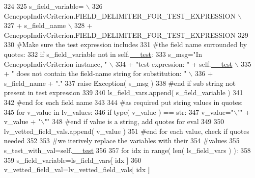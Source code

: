 \begin{DoxyCode}
324 
325             s\_field\_variable= \(\backslash\)
326                     GenepopIndivCriterion.FIELD\_DELIMITER\_FOR\_TEST\_EXPRESSION \(\backslash\)
327                     + s\_field\_name \(\backslash\)
328                     + GenepopIndivCriterion.FIELD\_DELIMITER\_FOR\_TEST\_EXPRESSION
329 
330             \textcolor{comment}{#Make sure the test expression includes}
331             \textcolor{comment}{#the field name surrounded by quotes:}
332             \textcolor{keywordflow}{if} s\_field\_variable  \textcolor{keywordflow}{not} \textcolor{keywordflow}{in} self.\hyperlink{classnegui_1_1genepopindividualid_1_1GenepopIndivCriterion_a4366f9abf2851f4e83b62de2836ab812}{\_\_test}:
333                 s\_msg=\textcolor{stringliteral}{"In GenepopIndivCriterion instance, "} \(\backslash\)
334                         + \textcolor{stringliteral}{"test expression: "} + self.\hyperlink{classnegui_1_1genepopindividualid_1_1GenepopIndivCriterion_a4366f9abf2851f4e83b62de2836ab812}{\_\_test} \(\backslash\)
335                         + \textcolor{stringliteral}{" does not contain the field-name string for substitution: "} \(\backslash\)
336                         + s\_field\_name + \textcolor{stringliteral}{"."}
337                 \textcolor{keywordflow}{raise} Exception( s\_msg )
338             \textcolor{comment}{#end if sub string not present in test expression}
339 
340             ls\_field\_vars.append( s\_field\_variable )
341 
342         \textcolor{comment}{#end for each field name}
343         
344         \textcolor{comment}{#as required put string values in quotes:}
345         \textcolor{keywordflow}{for} v\_value \textcolor{keywordflow}{in} lv\_values:
346             \textcolor{keywordflow}{if} type( v\_value ) == str:
347                 v\_value=\textcolor{stringliteral}{"\(\backslash\)""} + v\_value + \textcolor{stringliteral}{"\(\backslash\)""}
348             \textcolor{comment}{#end if value is a string, add quotes for eval}
349 
350             lv\_vetted\_field\_vals.append( v\_value )
351         \textcolor{comment}{#end for each value, check if quotes needed}
352     
353         \textcolor{comment}{#we iterively replace the variables with their}
354         \textcolor{comment}{#values}
355         s\_test\_with\_val=self.\hyperlink{classnegui_1_1genepopindividualid_1_1GenepopIndivCriterion_a4366f9abf2851f4e83b62de2836ab812}{\_\_test}
356     
357         \textcolor{keywordflow}{for} idx \textcolor{keywordflow}{in} range( len( ls\_field\_vars ) ):
358 
359             s\_field\_variable=ls\_field\_vars[ idx ]
360             v\_vetted\_field\_val=lv\_vetted\_field\_vals[ idx ]

\end{DoxyCode}
